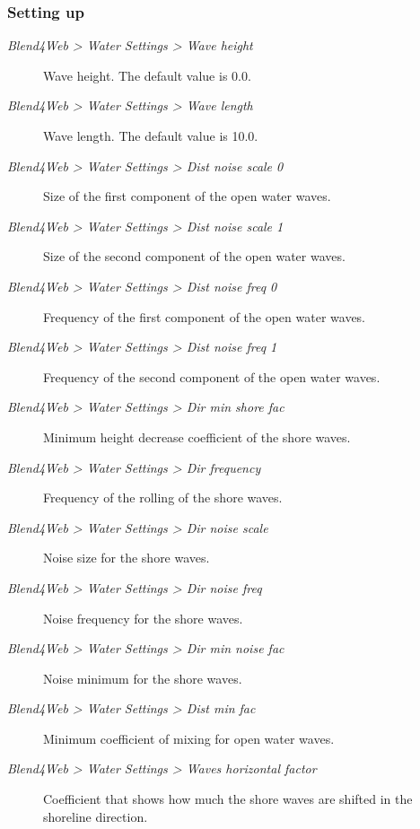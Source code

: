 \documentclass[a4paper,12pt,oneside]{sphinxmanual}
\begin{document}
\subsubsection{Setting up}
\label{outdoor_rendering:id22}\begin{description}
\item[{\emph{Blend4Web \textgreater{} Water Settings \textgreater{} Wave height}}] \leavevmode
Wave height. The default value is 0.0.

\item[{\emph{Blend4Web \textgreater{} Water Settings \textgreater{} Wave length}}] \leavevmode
Wave length. The default value is 10.0.

\item[{\emph{Blend4Web \textgreater{} Water Settings \textgreater{} Dist noise scale 0}}] \leavevmode
Size of the first component of the open water waves.

\item[{\emph{Blend4Web \textgreater{} Water Settings \textgreater{} Dist noise scale 1}}] \leavevmode
Size of the second component of the open water waves.

\item[{\emph{Blend4Web \textgreater{} Water Settings \textgreater{} Dist noise freq 0}}] \leavevmode
Frequency of the first component of the open water waves.

\item[{\emph{Blend4Web \textgreater{} Water Settings \textgreater{} Dist noise freq 1}}] \leavevmode
Frequency of the second component of the open water waves.

\item[{\emph{Blend4Web \textgreater{} Water Settings \textgreater{} Dir min shore fac}}] \leavevmode
Minimum height decrease coefficient of the shore waves.

\item[{\emph{Blend4Web \textgreater{} Water Settings \textgreater{} Dir frequency}}] \leavevmode
Frequency of the rolling of the shore waves.

\item[{\emph{Blend4Web \textgreater{} Water Settings \textgreater{} Dir noise scale}}] \leavevmode
Noise size for the shore waves.

\item[{\emph{Blend4Web \textgreater{} Water Settings \textgreater{} Dir noise freq}}] \leavevmode
Noise frequency for the shore waves.

\item[{\emph{Blend4Web \textgreater{} Water Settings \textgreater{} Dir min noise fac}}] \leavevmode
Noise minimum for the shore waves.

\item[{\emph{Blend4Web \textgreater{} Water Settings \textgreater{} Dist min fac}}] \leavevmode
Minimum coefficient of mixing for open water waves.

\item[{\emph{Blend4Web \textgreater{} Water Settings \textgreater{} Waves horizontal factor}}] \leavevmode
Coefficient that shows how much the shore waves are shifted in the shoreline direction.

\end{description}
\end{document}
